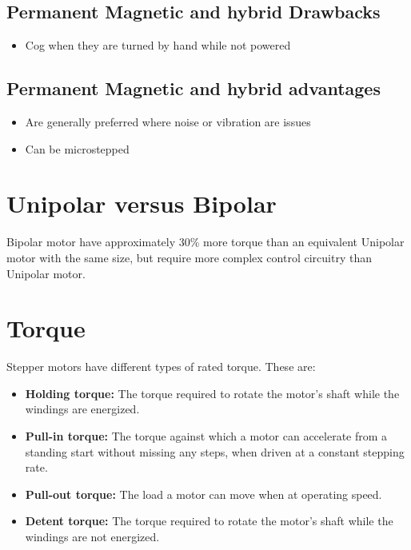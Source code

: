 \documentclass{report}
\begin{document}
\subsection*{Permanent Magnetic and hybrid Drawbacks}
\begin{itemize}
  \item Cog when they are turned by hand while not powered 
\end{itemize}

\subsection*{Permanent Magnetic and hybrid advantages}
\begin{itemize}
  \item Are generally preferred where noise or vibration are issues
  \item Can be microstepped
\end{itemize}

\section*{Unipolar versus Bipolar}
Bipolar motor have approximately 30\% more torque than an equivalent Unipolar motor with the same size,
but require more complex control circuitry than Unipolar motor. 

\section*{Torque}
Stepper motors have different types of rated torque. These are:
\begin{itemize}
  \item \textbf{Holding torque:} The torque required to rotate the
        motor’s shaft while the windings are energized.
  \item \textbf{Pull-in torque:} The torque against which a motor
        can accelerate from a standing start without
        missing any steps, when driven at a constant
        stepping rate.
  \item \textbf{Pull-out torque:} The load a motor can move
        when at operating speed.
  \item \textbf{Detent torque:} The torque required to rotate the
        motor’s shaft while the windings are not
        energized.
\end{itemize}
\end{document}
